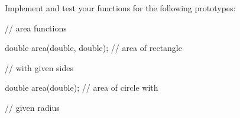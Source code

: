 Implement and test your functions for the following prototypes:



\begin{consolethree}[escapeinside=||]

// area functions

double area(double, double); // area of rectangle

                             // with given sides

double area(double);         // area of circle with

                             // given radius

\end{consolethree}

